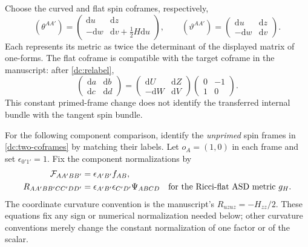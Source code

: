 \documentclass[11pt]{article}
\numberwithin{equation}{section}
\theoremstyle{remark}
\newcommand{\dd}{\mathrm d}
\begin{document}
Choose the curved and flat spin coframes, respectively,
\begin{equation}\label{dc:two-coframes}
 (\theta^{AA'})=
 \begin{pmatrix}\dd u&\dd z\\-\dd w&\dd v+\frac12H\dd u\end{pmatrix},
 \qquad
 (\vartheta^{AA'})=
 \begin{pmatrix}\dd u&\dd z\\-\dd w&\dd v\end{pmatrix}.
\end{equation}
Each represents its metric as twice the determinant of the displayed
matrix of one-forms. The flat coframe is compatible with the target
coframe in the manuscript: after \eqref{dc:relabel},
\begin{equation}
 \begin{pmatrix}\dd a&\dd b\\\dd c&\dd d\end{pmatrix}
 =\begin{pmatrix}\dd U&\dd Z\\-\dd W&\dd V\end{pmatrix}
 \begin{pmatrix}0&-1\\1&0\end{pmatrix}.
\end{equation}
This constant primed-frame change does not identify the transferred
internal bundle with the tangent spin bundle.

For the following component comparison, identify the \emph{unprimed}
spin frames in \eqref{dc:two-coframes} by matching their labels.
Let $o_A=(1,0)$ in each frame and set $\epsilon_{0'1'}=1$.
Fix the component normalizations by
\begin{align}
 \mathcal F_{AA'BB'}&=\epsilon_{A'B'}f_{AB},
 \label{dc:Maxwell-spinor-convention}\\
 R_{AA'BB'CC'DD'}&=
 \epsilon_{A'B'}\epsilon_{C'D'}\Psi_{ABCD}
 \quad\hbox{for the Ricci-flat ASD metric }g_H.
 \label{dc:Weyl-spinor-convention}
\end{align}
The coordinate curvature convention is the manuscript's
$R_{uzuz}=-H_{zz}/2$. These equations fix any sign or numerical
normalization needed below; other curvature conventions merely change
the constant normalization of one factor or of the scalar.
\end{document}
